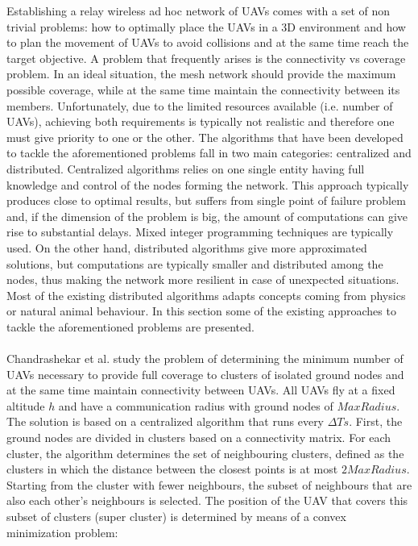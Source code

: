 Establishing a relay wireless ad hoc network of \glspl{UAV} comes with a set of non trivial problems: how to optimally place the \glspl{UAV} in a 3D environment and how to plan the movement of \glspl{UAV} to avoid collisions and at the same time reach the target objective. A problem that frequently arises is the connectivity vs coverage problem. In an ideal situation, the mesh network should provide the maximum possible coverage, while at the same time maintain the connectivity between its members. Unfortunately, due to the limited resources available (i.e. number of \glspl{UAV}), achieving both requirements is typically not realistic and therefore one must give priority to one or the other. The algorithms that have been developed to tackle the aforementioned problems fall in two main categories: centralized and distributed. Centralized algorithms relies on one single entity having full knowledge and control of the nodes forming the network. This approach typically produces close to optimal results, but suffers from single point of failure problem and, if the dimension of the problem is big, the amount of computations can give rise to substantial delays. Mixed integer programming techniques are typically used. On the other hand, distributed algorithms give more approximated solutions, but computations are typically smaller and distributed among the nodes, thus making the network more resilient in case of unexpected situations. Most of the existing distributed algorithms adapts concepts coming from physics or natural animal behaviour. In this section some of the existing approaches to tackle the aforementioned problems are presented. \\\\
Chandrashekar et al. \cite{ref:soa-plac-centr1} study the problem of determining the minimum number of \glspl{UAV} necessary to provide full coverage to clusters of isolated ground nodes and at the same time maintain connectivity between \glspl{UAV}. All \glspl{UAV} fly at a fixed altitude $h$ and have a communication radius with ground nodes of $MaxRadius$. The solution is based on a centralized algorithm that runs every $\Delta T s$. First, the ground nodes are divided in clusters based on a connectivity matrix.
For each cluster, the algorithm determines the set of neighbouring clusters, defined as the clusters in which the distance between the closest points is at most $2MaxRadius$. Starting from the cluster with fewer neighbours, the subset of neighbours that are also each other's neighbours is selected. The position of the \gls{UAV} that covers this subset of clusters (super cluster) is determined by means of a convex minimization problem:

